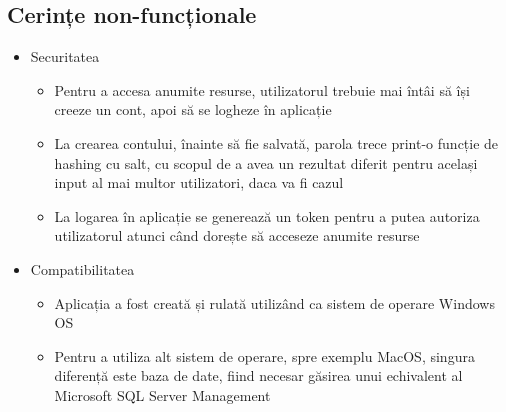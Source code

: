 \subsection{Cerințe non-funcționale}
\begin{itemize}
    \setlength\itemsep{0.5em}
    \item Securitatea
    \begin{itemize}
        \setlength\itemsep{0.5em}
        \item Pentru a accesa anumite resurse, utilizatorul trebuie mai întâi să își creeze un cont, apoi să se logheze în aplicație
        \item La crearea contului, înainte să fie salvată, parola trece print-o funcție de hashing cu salt, cu scopul de a avea un rezultat diferit pentru același input al mai multor utilizatori, daca va fi cazul
        \item La logarea în aplicație se generează un token pentru a putea autoriza utilizatorul atunci când dorește să acceseze anumite resurse
    \end{itemize}
    \item Compatibilitatea
    \begin{itemize}
        \setlength\itemsep{0.5em}
        \item Aplicația a fost creată și rulată utilizând ca sistem de operare Windows OS
        \item Pentru a utiliza alt sistem de operare, spre exemplu MacOS, singura diferență este baza de date, fiind necesar găsirea unui echivalent al Microsoft SQL Server Management
    \end{itemize}
\end{itemize}


